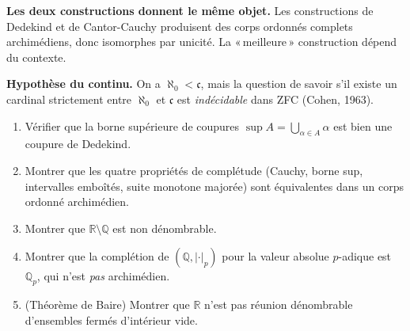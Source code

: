 \vspace{6pt}

\begin{mdframed}[style=cexbar]
  \textbf{Les deux constructions donnent le même objet.}\enspace%
  Les constructions de Dedekind et de Cantor-Cauchy produisent des corps
  ordonnés complets archimédiens, donc isomorphes par unicité.
  La «\,meilleure\,» construction dépend du contexte.

  \smallskip\noindent
  \textbf{Hypothèse du continu.}\enspace%
  On a $\aleph_0 < \mathfrak{c}$, mais la question de savoir s'il existe
  un cardinal strictement entre $\aleph_0$ et $\mathfrak{c}$ est
  \emph{indécidable} dans ZFC (Cohen, 1963).
\end{mdframed}

\vspace{6pt}
\exolabel

\begin{mdframed}[style=exobar]
  \begin{enumerate}
    \item Vérifier que la borne supérieure de coupures $\sup A = \bigcup_{\alpha\in A}\alpha$
          est bien une coupure de Dedekind.

    \item Montrer que les quatre propriétés de complétude (Cauchy, borne sup,
          intervalles emboîtés, suite monotone majorée) sont équivalentes dans
          un corps ordonné archimédien.

    \item Montrer que $\mathbb{R}\setminus\mathbb{Q}$ est non dénombrable.

    \item Montrer que la complétion de $(\mathbb{Q}, |\cdot|_p)$ pour la valeur
          absolue $p$-adique est $\mathbb{Q}_p$, qui n'est \emph{pas} archimédien.

    \item (Théorème de Baire) Montrer que $\mathbb{R}$ n'est pas réunion
          dénombrable d'ensembles fermés d'intérieur vide.
  \end{enumerate}
\end{mdframed}

